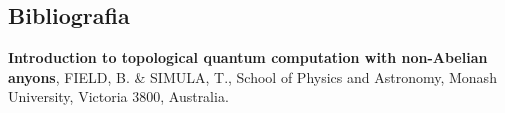 \documentclass{beamer}
\begin{document}
	\begin{frame}{\subsecname}
	
	\end{frame}
	
	\subsection{Bibliografia}
	
	\begin{frame}{\subsecname}
		
		 \textbf{Introduction to topological quantum computation with non-Abelian anyons}, FIELD, B. \& SIMULA, T., School of Physics and Astronomy, Monash University, Victoria 3800, Australia.
		
		\bibitem{}
	\end{frame}
\end{document}
